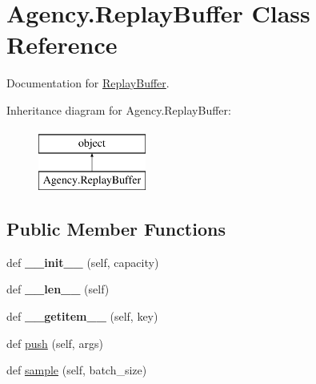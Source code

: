 \hypertarget{classAgency_1_1ReplayBuffer}{}\section{Agency.\+Replay\+Buffer Class Reference}
\label{classAgency_1_1ReplayBuffer}


Documentation for \mbox{\hyperlink{classAgency_1_1ReplayBuffer}{Replay\+Buffer}}.  


Inheritance diagram for Agency.\+Replay\+Buffer\+:\begin{figure}[H]
\begin{center}
\leavevmode
\includegraphics[height=2.000000cm]{classAgency_1_1ReplayBuffer}
\end{center}
\end{figure}
\subsection*{Public Member Functions}
\begin{DoxyCompactItemize}
\item 
\mbox{\label{classAgency_1_1ReplayBuffer_ae1d76f1730f31d4fa36c7f7490e7fa2c}} 
def {\bfseries \+\_\+\+\_\+init\+\_\+\+\_\+} (self, capacity)
\item 
\mbox{\label{classAgency_1_1ReplayBuffer_a7792c36c85702b20aadfd91ec4c4326f}} 
def {\bfseries \+\_\+\+\_\+len\+\_\+\+\_\+} (self)
\item 
\mbox{\label{classAgency_1_1ReplayBuffer_ad6b534eb2f5e5d14a19504c543a061ac}} 
def {\bfseries \+\_\+\+\_\+getitem\+\_\+\+\_\+} (self, key)
\item 
def \mbox{\hyperlink{classAgency_1_1ReplayBuffer_a42eb421de8a87af670f58c2c9f47819c}{push}} (self, args)
\item 
def \mbox{\hyperlink{classAgency_1_1ReplayBuffer_ad4826e3b32056d091daed1120862760c}{sample}} (self, batch\+\_\+size)
\end{DoxyCompactItemize}
